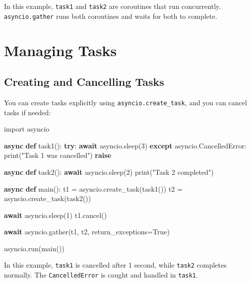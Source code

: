 \documentclass[
  letterpaper,
  DIV=11,
  numbers=noendperiod]{scrreprt}
\newenvironment{Shaded}{\begin{snugshade}}{\end{snugshade}}
\newcommand{\BuiltInTok}[1]{\textcolor[rgb]{0.00,0.23,0.31}{#1}}
\newcommand{\ControlFlowTok}[1]{\textcolor[rgb]{0.00,0.23,0.31}{\textbf{#1}}}
\newcommand{\DecValTok}[1]{\textcolor[rgb]{0.68,0.00,0.00}{#1}}
\newcommand{\ImportTok}[1]{\textcolor[rgb]{0.00,0.46,0.62}{#1}}
\newcommand{\KeywordTok}[1]{\textcolor[rgb]{0.00,0.23,0.31}{\textbf{#1}}}
\newcommand{\NormalTok}[1]{\textcolor[rgb]{0.00,0.23,0.31}{#1}}
\newcommand{\OperatorTok}[1]{\textcolor[rgb]{0.37,0.37,0.37}{#1}}
\newcommand{\StringTok}[1]{\textcolor[rgb]{0.13,0.47,0.30}{#1}}
\newcommand{\VariableTok}[1]{\textcolor[rgb]{0.07,0.07,0.07}{#1}}
\begin{document}
In this example, \texttt{task1} and \texttt{task2} are coroutines that
run concurrently. \texttt{asyncio.gather} runs both coroutines and waits
for both to complete.

\section{Managing Tasks}\label{managing-tasks}

\subsection{Creating and Cancelling
Tasks}\label{creating-and-cancelling-tasks}

You can create tasks explicitly using \texttt{asyncio.create\_task}, and
you can cancel tasks if needed:

\begin{Shaded}
\begin{Highlighting}[]
\ImportTok{import}\NormalTok{ asyncio}

\ControlFlowTok{async} \KeywordTok{def}\NormalTok{ task1():}
    \ControlFlowTok{try}\NormalTok{:}
        \ControlFlowTok{await}\NormalTok{ asyncio.sleep(}\DecValTok{3}\NormalTok{)}
    \ControlFlowTok{except}\NormalTok{ asyncio.CancelledError:}
        \BuiltInTok{print}\NormalTok{(}\StringTok{"Task 1 was cancelled"}\NormalTok{)}
        \ControlFlowTok{raise}

\ControlFlowTok{async} \KeywordTok{def}\NormalTok{ task2():}
    \ControlFlowTok{await}\NormalTok{ asyncio.sleep(}\DecValTok{2}\NormalTok{)}
    \BuiltInTok{print}\NormalTok{(}\StringTok{"Task 2 completed"}\NormalTok{)}

\ControlFlowTok{async} \KeywordTok{def}\NormalTok{ main():}
\NormalTok{    t1 }\OperatorTok{=}\NormalTok{ asyncio.create\_task(task1())}
\NormalTok{    t2 }\OperatorTok{=}\NormalTok{ asyncio.create\_task(task2())}

    \ControlFlowTok{await}\NormalTok{ asyncio.sleep(}\DecValTok{1}\NormalTok{)}
\NormalTok{    t1.cancel()}

    \ControlFlowTok{await}\NormalTok{ asyncio.gather(t1, t2, return\_exceptions}\OperatorTok{=}\VariableTok{True}\NormalTok{)}

\NormalTok{asyncio.run(main())}
\end{Highlighting}
\end{Shaded}

In this example, \texttt{task1} is cancelled after 1 second, while
\texttt{task2} completes normally. The \texttt{CancelledError} is caught
and handled in \texttt{task1}.
\end{document}
